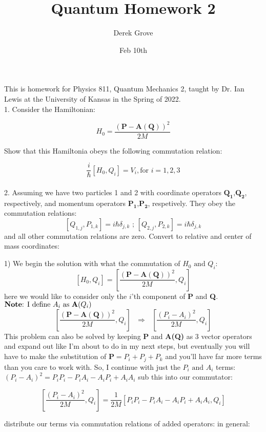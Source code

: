 \documentclass[11pt, letterpaper]{article}
\title{Quantum Homework 2}
\author{Derek Grove}
\date{Feb 10th}
\begin{document}
\begin{titlepage}
\maketitle

This is homework for Physics 811, Quantum Mechanics 2, taught by Dr. Ian Lewis at the University of Kansas in the Spring of 2022.\\

1. Consider the Hamiltonian:


  \[H_0=\frac{(\mathbf{P-A(Q)})^2}{2M}\]


Show that this Hamiltonia obeys the following commutation relation:

\[\frac{i}{\hbar}[H_0,Q_i]=V_i,\text{for }i=1,2,3\]
\\

2. Assuming we have two particles 1 and 2 with coordinate operators \(\mathbf{Q_1\text{,}Q_2}\), respectively, and momentum operators \(\mathbf{P_1\text{,}P_2}\), respetively. They obey the commutation relations:
\[[Q_{1,j},P_{1,k}]=i\hbar\delta_{j,k}\text{ ; }[Q_{2,j},P_{2,k}]=i\hbar\delta_{j,k}\]
and all other commutation relations are zero. Convert to relative and center of mass coordinates:

\end{titlepage}

1) We begin the solution with what the commutation of \(H_0 \text{ and } Q_i\):
\[[H_0,Q_i]=[\frac{(\mathbf{P-A(Q)})^2}{2M},Q_i]\]
here we would like to consider only the \(i\)'th component of \textbf{P} and \textbf{Q}.
\\
\(\text{\textbf{Note}: I define }  A_i \text{ as }\mathbf{A}(Q_i)\)\\
\[[\frac{(\mathbf{P-A(Q)})^2}{2M},Q_i] \text{ }\Longrightarrow\text{ } [\frac{({P_i-A_i})^2}{2M},Q_i]\]
This problem can also be solved by keeping \textbf{P} and \textbf{A(Q)} as 3 vector operators and expand out like I'm about to do in my next steps, but eventually you will have to make the substitution of \(\mathbf{P} = P_i + P_j + P_k\) and you'll have far more terms than you care to work with. So, I continue with just the \(P_i \text{ and } A_i\) terms:
\((P_i - A_i)^2=P_iP_i - P_iA_i - A_iP_i+A_iA_i\)
sub this into our commutator:

\[[\frac{({P_i-A_i})^2}{2M},Q_i]=\frac{1}{2M}[P_iP_i - P_iA_i - A_iP_i+A_iA_i, Q_i]\]

distribute our terms via commutation relations of added operators:
in general:
\end{document}
